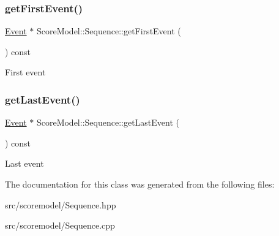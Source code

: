 \subsubsection{\texorpdfstring{getFirstEvent()}{getFirstEvent()}}
{\footnotesize\ttfamily \mbox{\hyperlink{classScoreModel_1_1Event}{Event}} $\ast$ Score\+Model\+::\+Sequence\+::get\+First\+Event (\begin{DoxyParamCaption}{ }\end{DoxyParamCaption}) const}

First event \mbox{\label{classScoreModel_1_1Sequence_a81d2c999746137ff4601bb1b5aa08f18}} 
\subsubsection{\texorpdfstring{getLastEvent()}{getLastEvent()}}
{\footnotesize\ttfamily \mbox{\hyperlink{classScoreModel_1_1Event}{Event}} $\ast$ Score\+Model\+::\+Sequence\+::get\+Last\+Event (\begin{DoxyParamCaption}{ }\end{DoxyParamCaption}) const}

Last event 

The documentation for this class was generated from the following files\+:\begin{DoxyCompactItemize}
\item 
src/scoremodel/Sequence.\+hpp\item 
src/scoremodel/Sequence.\+cpp\end{DoxyCompactItemize}
